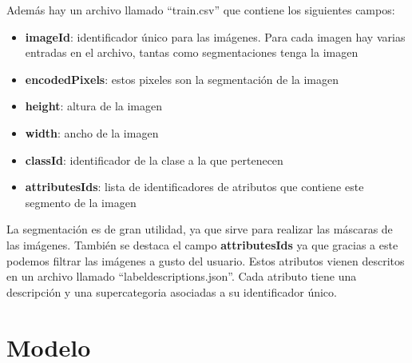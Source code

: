 \documentclass[12pt]{report} %
\begin{document}
	Además hay un archivo llamado ``train.csv'' que contiene los siguientes campos:
	\begin{itemize}
		\item \textbf{imageId}: identificador único para las imágenes. Para cada imagen hay varias entradas en el archivo, tantas como segmentaciones
		tenga la imagen
		\item \textbf{encodedPixels}: estos pixeles son la segmentación de la imagen
		\item \textbf{height}: altura de la imagen
		\item \textbf{width}: ancho de la imagen
		\item \textbf{classId}: identificador de la clase a la que pertenecen
		\item \textbf{attributesIds}: lista de identificadores de atributos que contiene este segmento de la imagen 
	\end{itemize}

	La segmentación es de gran utilidad, ya que sirve para realizar las máscaras de las imágenes. 
	También se destaca el campo \textbf{attributesIds} ya que gracias a este podemos filtrar las 
	imágenes a gusto del usuario. Estos atributos vienen descritos en un archivo llamado ``label\textunderscore descriptions.json''.
	Cada atributo tiene una descripción y una supercategoria asociadas a su identificador único.

	\section{Modelo}
\end{document}
